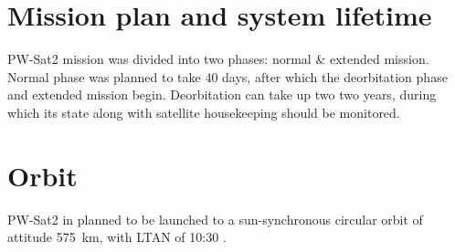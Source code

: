     \section{Mission plan and system lifetime}
        PW-Sat2 mission was divided into two phases: normal \& extended mission. Normal phase was planned to take 40 days, after which the deorbitation phase and extended mission begin. Deorbitation can  take up two two years, during which its state along with satellite housekeeping should be monitored.

    \section{Orbit}
        PW-Sat2 in planned to be launched to a sun-synchronous circular orbit of attitude \SI{575}{\kilo\meter}, with LTAN of 10:30 \cite{PWSAT_MA_CDR}.